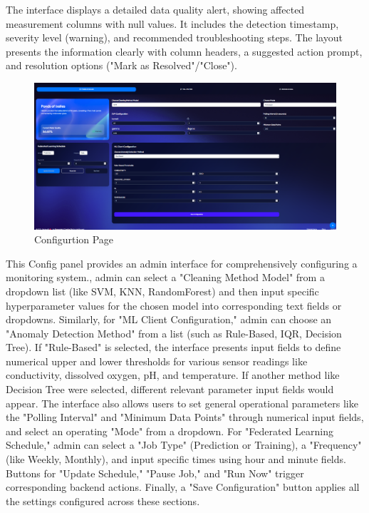 The interface displays a detailed data quality alert, showing affected measurement columns with null values. It includes the detection timestamp, severity level (warning), and recommended troubleshooting steps. The layout presents the information clearly with column headers, a suggested action prompt, and resolution options ("Mark as Resolved"/"Close").

\begin{figure}[H]
    \centering
    \includegraphics[width=0.75\linewidth]{Figures/configpage.png}
    \caption{Configurtion Page}
    \label{fig:enter-label}
\end{figure}


This Config panel provides an admin interface for comprehensively configuring a monitoring system., admin can select a "Cleaning Method Model" from a dropdown list (like SVM, KNN, RandomForest) and then input specific hyperparameter values for the chosen model into corresponding text fields or dropdowns. Similarly, for "ML Client Configuration," admin can choose an "Anomaly Detection Method" from a list (such as Rule-Based, IQR, Decision Tree). If "Rule-Based" is selected, the interface presents input fields to define numerical upper and lower thresholds for various sensor readings like conductivity, dissolved oxygen, pH, and temperature. If another method like Decision Tree were selected, different relevant parameter input fields would appear.
The interface also allows users to set general operational parameters like the "Polling Interval" and "Minimum Data Points" through numerical input fields, and select an operating "Mode" from a dropdown. For "Federated Learning Schedule," admin can select a "Job Type" (Prediction or Training), a "Frequency" (like Weekly, Monthly), and input specific times using hour and minute fields. Buttons for "Update Schedule," "Pause Job," and "Run Now" trigger corresponding backend actions. Finally, a "Save Configuration" button applies all the settings configured across these sections.


